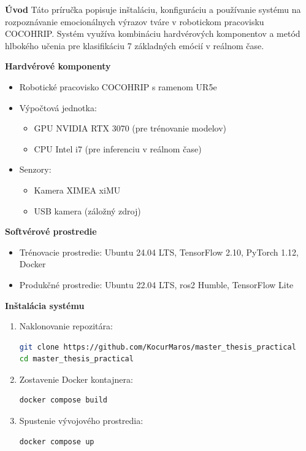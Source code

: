 
\textbf{Úvod}  
Táto príručka popisuje inštaláciu, konfiguráciu a používanie systému na rozpoznávanie emocionálnych výrazov tváre v robotickom pracovisku COCOHRIP. Systém využíva kombináciu hardvérových komponentov a metód hlbokého učenia pre klasifikáciu 7 základných emócií v reálnom čase.

\textbf{Hardvérové komponenty}  
\begin{itemize}
\item Robotické pracovisko COCOHRIP s ramenom UR5e
\item Výpočtová jednotka: 
  \begin{itemize}
  \item GPU NVIDIA RTX 3070 (pre trénovanie modelov)
  \item CPU Intel i7 (pre inferenciu v reálnom čase)
  \end{itemize}
\item Senzory:
  \begin{itemize}
  \item Kamera XIMEA xiMU
  \item USB kamera (záložný zdroj)
  \end{itemize}
\end{itemize}


\textbf{Softvérové prostredie}  
\begin{itemize}
\item Trénovacie prostredie: Ubuntu 24.04 LTS, TensorFlow 2.10, PyTorch 1.12, Docker
\item Produkčné prostredie: Ubuntu 22.04 LTS, \gls{ros}2 Humble, TensorFlow Lite
\end{itemize}

\textbf{Inštalácia systému}  
\begin{enumerate}
\item Naklonovanie repozitára:
\begin{lstlisting}[language=bash]
git clone https://github.com/KocurMaros/master_thesis_practical
cd master_thesis_practical
\end{lstlisting}

\item Zostavenie Docker kontajnera:
\begin{lstlisting}[language=bash]
docker compose build
\end{lstlisting}

\item Spustenie vývojového prostredia:
\begin{lstlisting}[language=bash]
docker compose up
\end{lstlisting}
\end{enumerate}

